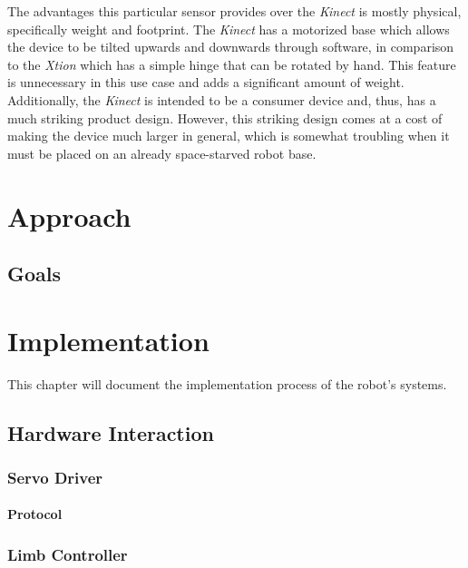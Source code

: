 \documentclass{l4proj}
\begin{document}
The advantages this particular sensor provides over the \emph{Kinect} is mostly physical, specifically weight and footprint. The \emph{Kinect} has a motorized base which allows the device to be tilted upwards and downwards through software, in comparison to the \emph{Xtion} which has a simple hinge that can be rotated by hand. This feature is unnecessary in this use case and adds a significant amount of weight. Additionally, the \emph{Kinect} is intended to be a consumer device and, thus, has a much striking product design. However, this striking design comes at a cost of making the device much larger in general, which is somewhat troubling when it must be placed on an already space-starved robot base.


\chapter{Approach}


\section{Goals}


\chapter{Implementation}

This chapter will document the implementation process of the robot's systems.

\section{Hardware Interaction}

\subsection{Servo Driver}
\subsubsection{Protocol}

\subsection{Limb Controller}
\end{document}

